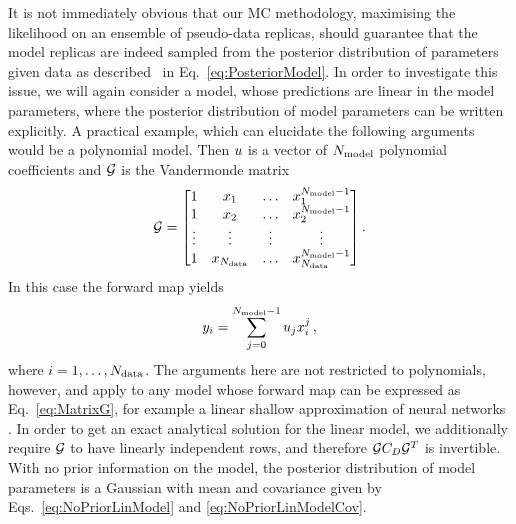 It is not immediately obvious that our MC methodology, maximising the likelihood
on an ensemble of pseudo-data replicas, should guarantee that the model replicas
are indeed sampled from the posterior distribution of parameters given data as
described \eg\ in Eq.~\ref{eq:PosteriorModel}. In order to investigate this
issue, we will again consider a model, whose predictions are linear in the model
parameters, where the posterior distribution of model parameters can be written
explicitly. A practical example, which can
elucidate the following arguments would be a polynomial model. Then $u$ is a
vector of $N_{\rm model}$ polynomial coefficients and $\mathcal{G}$ is the Vandermonde matrix
\begin{equation}
    \mathcal{G} =
    \begin{bmatrix}
        1  & x_1 & \ldots& x_1^{N_{\rm model}-1} \\ 
        1  & x_2 & \ldots& x_2^{N_{\rm model}-1} \\ 
        \vdots  & \vdots & \vdots& \vdots \\ 
        1  & x_{N_{\rm data}} & \ldots & x_{N_{\rm data}}^{N_{\rm model}-1} 
    \end{bmatrix}.
\end{equation}
In this case the forward map yields
\begin{equation}
    \label{eq:PolyMod}
    y_i = \sum_{j=0}^{N_{\rm model}-1} u_j x_i^j\, , 
\end{equation}
where $i=1,\ldots,N_{\rm data}$. The arguments here are not restricted to polynomials,
however, and apply to any model whose forward map can be expressed as
Eq.~\eqref{eq:MatrixG}, for example a linear shallow approximation of neural
networks \cite{ADVANI2020428}. In order to get an exact analytical solution for
the linear model, we additionally require $\mathcal{G}$ to have linearly independent
rows, and therefore $\mathcal{G} C_{D} \mathcal{G}^T$ is invertible. With no
prior information on the model, the posterior distribution of model parameters
is a Gaussian with mean and covariance given by Eqs.~\ref{eq:NoPriorLinModel}
and \ref{eq:NoPriorLinModelCov}.


